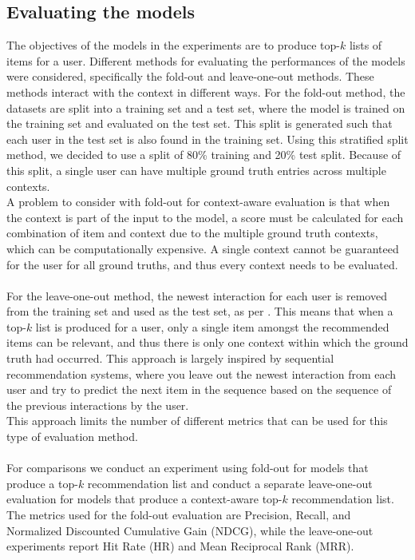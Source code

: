 \subsection{Evaluating the models}\label{subsec:evalandmetrics}
The objectives of the models in the experiments are to produce top-$k$ lists of items for a user. 
Different methods for evaluating the performances of the models were considered, specifically the fold-out and leave-one-out methods.
These methods interact with the context in different ways.
For the fold-out method, the datasets are split into a training set and a test set, where the model is trained on the training set and evaluated on the test set. 
This split is generated such that each user in the test set is also found in the training set.
Using this stratified split method, we decided to use a split of 80\% training and 20\% test split.
Because of this split, a single user can have multiple ground truth entries across multiple contexts.\\
A problem to consider with fold-out for context-aware evaluation is that when the context is part of the input to the model, a score must be calculated for each combination of item and context due to the multiple ground truth contexts, which can be computationally expensive.
A single context cannot be guaranteed for the user for all ground truths, and thus every context needs to be evaluated.
\\\\
For the leave-one-out method, the newest interaction for each user is removed from the training set and used as the test set, as per \cite{CFM, BPR}.
This means that when a top-$k$ list is produced for a user, only a single item amongst the recommended items can be relevant, and thus there is only one context within which the ground truth had occurred.
This approach is largely inspired by sequential recommendation systems, where you leave out the newest interaction from each user and try to predict the next item in the sequence based on the sequence of the previous interactions by the user.\\
This approach limits the number of different metrics that can be used for this type of evaluation method.
\\\\
For comparisons we conduct an experiment using fold-out for models that produce a top-$k$ recommendation list and conduct a separate leave-one-out evaluation for models that produce a context-aware top-$k$ recommendation list. 
The metrics used for the fold-out evaluation are Precision, Recall, and Normalized Discounted Cumulative Gain (NDCG), while the leave-one-out experiments report Hit Rate (HR) and Mean Reciprocal Rank (MRR).

